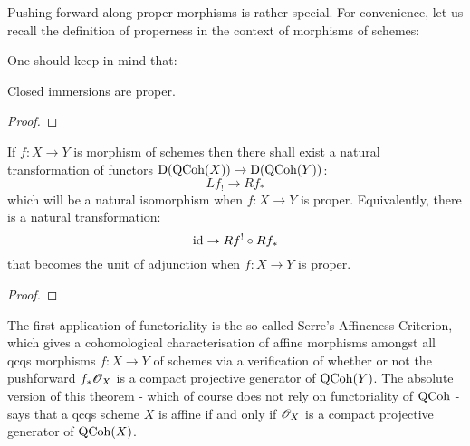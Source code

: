            \begin{definition} \label{def: dual_stable_(infinity, 1)_categories}
                
            \end{definition}
            
            Pushing forward along proper morphisms is rather special. For convenience, let us recall the definition of properness in the context of morphisms of schemes:
            \begin{definition} \label{def: proper_morphisms}
                
            \end{definition}
            One should keep in mind that:
            \begin{example}
                Closed immersions are proper.
            \end{example}
            \begin{lemma} \label{lemma: dualising_complexes_and_properly_supported_cohomology}
                
            \end{lemma}
                \begin{proof}
                    
                \end{proof}
            \begin{theorem} \label{theorem: proper_pushforwards}
                If $f: X \to Y$ is morphism of schemes then there shall exist a natural transformation of functors $\mathrm{D}(\mathrm{QCoh}(X)) \to \mathrm{D}(\mathrm{QCoh}(Y))$:
                    $$Lf_! \to Rf_*$$
                which will be a natural isomorphism when $f: X \to Y$ is proper. Equivalently, there is a natural transformation:
                    $$\mathrm{id} \to Rf^! \circ Rf_*$$
                that becomes the unit of adjunction when $f: X \to Y$ is proper. 
            \end{theorem}
                \begin{proof}
                    
                \end{proof}

            The first application of functoriality is the so-called Serre's Affineness Criterion, which gives a cohomological characterisation of affine morphisms amongst all qcqs morphisms $f: X \to Y$ of schemes via a verification of whether or not the pushforward $f_*\mathscr{O}_X$ is a compact projective generator of $\mathrm{QCoh}(Y)$. The absolute version of this theorem - which of course does not rely on functoriality of $\mathrm{QCoh}$ - says that a qcqs scheme $X$ is affine if and only if $\mathscr{O}_X$ is a compact projective generator of $\mathrm{QCoh}(X)$.
            
